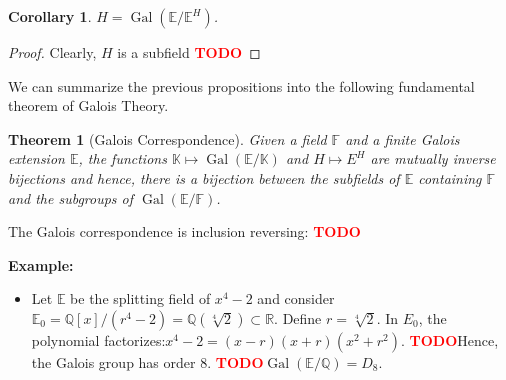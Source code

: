 \documentclass{article}
\newtheorem*{theorem}{Theorem}
\newtheorem*{corollary}{Corollary}
\newcommand{\R}{\mathbb{R}}
\newcommand{\Q}{\mathbb{Q}}
\newcommand{\F}{\mathbb{F}}
\newcommand{\E}{\mathbb{E}}
\newcommand{\K}{\mathbb{K}}
\DeclareMathOperator{\Gal}{\text{Gal}}
\newcommand{\td}{\textcolor{red}{\textbf{TODO}}}
\newenvironment{example}{\noindent\textbf{Example:} \vspace{-0.2cm}\begin{itemize}}{\end{itemize}}
\begin{document}
\begin{corollary}
    $H = \Gal(\E / \E^H)$.
\end{corollary}

\begin{proof}
    Clearly, $H$ is a subfield \td 
\end{proof}

We can summarize the previous propositions into the following fundamental theorem of Galois Theory.

\begin{theorem}[Galois Correspondence]
    Given a field $\F$ and a finite Galois extension $\E$, the functions $\K \mapsto \Gal(\E / \K)$ and $H \mapsto E^H$ are mutually inverse bijections and hence, there is a bijection between the subfields of $\E$ containing $\F$ and the subgroups of $\Gal(\E / \F)$.
\end{theorem}

The Galois correspondence is inclusion reversing: \td

\begin{example}
    \item Let $\E$ be the splitting field of $x^4 - 2$ and consider $\E_0 = \Q[x]/(r^4 - 2) = \Q(\sqrt[4]{2}) \subset \R$. Define $r = \sqrt[4]{2}$. In $E_0$, the polynomial factorizes:$x^4 - 2 = (x - r)(x + r)(x^2 + r^2)$. \td Hence, the Galois group has order 8. \td $\Gal(\E / \Q) = D_8$. 
\end{example}
\end{document}
